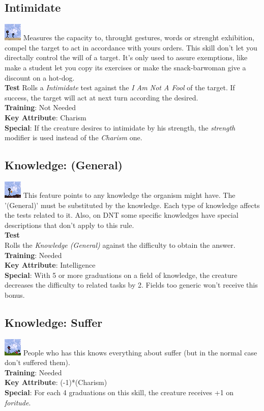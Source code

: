 \documentclass[ letterpaper,12pt]{article}
\begin{document}
\subsection{Intimidate}
\includegraphics{../data/skills/Img/intimidar.png}
Measures the capacity to, throught gestures, words or strenght exhibition, compel the target to act in accordance with yours orders. This skill don't let you directally control the will of a target. It's only used to assure exemptions, like make a student let you copy its exercises or make the snack-barwoman give a discount on a hot-dog.\\
{\bf Test}
Rolls a {\it Intimidate} test against the {\it I Am Not A Fool} of the target. If success, the target will act at next turn according the desired.\\
{\bf Training}: Not Needed\\
{\bf Key Attribute}: Charism\\
{\bf Special}: If the creature desires to intimidate by his strength, the {\it strength} modifier is used instead of the {\it Charism} one.

\subsection{Knowledge: (General)}
\includegraphics{../data/skills/Img/cnhgeral.png}
This feature points to any knowledge the organism might have. The '(General)' must be substituted by the knowledge. Each type of  knowledge affects the tests related to it. Also, on DNT some specific knowledges have special descriptions that don't apply to this rule.\\
{\bf Test}\\
Rolls the {\it Knowledge (General)} against the difficulty to obtain the answer.\\
{\bf Training}: Needed\\
{\bf Key Attribute}: Intelligence\\
{\bf Special}: With 5 or more graduations on a field of knowledge, the creature decreases the difficulty to related tasks by 2. Fields too generic won't receive this bonus.

\subsection{Knowledge: Suffer}
\includegraphics{../data/skills/Img/cnhsofrimento.png}
People who has this knows everything about suffer (but in the normal case don't suffered them).\\
{\bf Training}: Needed\\
{\bf Key Attribute}: (-1)*(Charism)\\
{\bf Special}: For each 4 graduations on this skill, the creature receives +1 on {\it foritude}.
\end{document}
